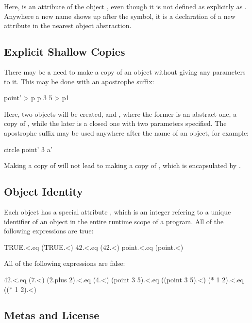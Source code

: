 Here,  is an attribute of the object , even though
it is not defined as explicitly as . Anywhere a new
name shows up after the \ff{>} symbol, it is a declaration of a new
attribute in the nearest object abstraction.

\subsection{Explicit Shallow Copies}

There may be a need to make a copy of an object without giving any
parameters to it. This may be done with an apostrophe suffix:

\begin{ffcode}
point' > p
p 3 5 > p1
\end{ffcode}

Here, two objects will be created,  and , where
the former is an abstract one, a copy of , while the
later is a closed one with two parameters specified. The
apostrophe suffix may be used anywhere after the name of an object,
for example:

\begin{ffcode}
circle
  point' 3 a'
\end{ffcode}

Making a copy of  will not lead to making a copy of ,
which is encapsulated by .

\subsection{Object Identity}

Each object has a special attribute \ff{<}, which is an integer
refering to a unique identifier of an object in the entire
runtime scope of a program. All of the following expressions are true:

\begin{ffcode}
TRUE.<.eq (TRUE.<)
42.<.eq (42.<)
point.<.eq (point.<)
\end{ffcode}

All of the following expressions are false:

\begin{ffcode}
42.<.eq (7.<)
(2.plus 2).<.eq (4.<)
(point 3 5).<.eq ((point 3 5).<)
(* 1 2).<.eq ((* 1 2).<)
\end{ffcode}

\subsection{Metas and License}

